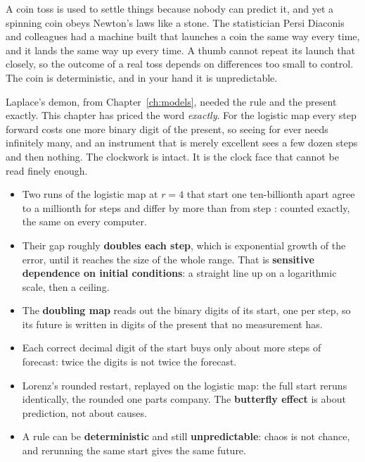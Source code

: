 \begin{worldbox}
A coin toss is used to settle things because nobody can predict it, and yet
a spinning coin obeys Newton's laws like a stone. The statistician Persi
Diaconis and colleagues had a machine built that launches a coin the same
way every time, and it lands the same way up every time. A thumb cannot
repeat its launch that closely, so the outcome of a real toss depends on
differences too small to control. The coin is deterministic, and in your
hand it is unpredictable.
\end{worldbox}

\noindent
Laplace's demon, from Chapter~\ref{ch:models}, needed the rule and the
present exactly. This chapter has priced the word \emph{exactly}. For the
logistic map every step forward costs one more binary digit of the present,
so seeing for ever needs infinitely many, and an instrument that is merely
excellent sees a few dozen steps and then nothing. The clockwork is intact.
It is the clock face that cannot be read finely enough.

\begin{summarybox}
\begin{itemize}
\item Two runs of the logistic map at $r = 4$ that start one ten-billionth
  apart agree to a millionth for  steps and differ by
  more than  from step : counted exactly,
  the same on every computer.
\item Their gap roughly \textbf{doubles each step}, which is exponential
  growth of the error, until it reaches the size of the whole range. That is
  \textbf{sensitive dependence on initial conditions}: a straight line up on a
  logarithmic scale, then a ceiling.
\item The \textbf{doubling map} reads out the binary digits of its start, one
  per step, so its future is written in digits of the present that no
  measurement has.
\item Each correct decimal digit of the start buys only about
   more steps of forecast: twice the digits is not twice
  the forecast.
\item Lorenz's rounded restart, replayed on the logistic map: the full start
  reruns identically, the rounded one parts company. The \textbf{butterfly
  effect} is about prediction, not about causes.
\item A rule can be \textbf{deterministic} and still \textbf{unpredictable}:
  chaos is not chance, and rerunning the same start gives the same future.
\end{itemize}
\end{summarybox}

